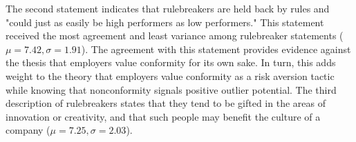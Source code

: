 \documentclass[review]{elsarticle}
\begin{document}
The second statement indicates that rulebreakers are held back by rules and "could just as easily be high performers as low performers."
This statement received the most agreement and least variance among rulebreaker statements ($\mu = 7.42, \sigma = 1.91$).
The agreement with this statement provides evidence against the thesis that employers value conformity for its own sake.
In turn, this adds weight to the theory that employers value conformity as a risk aversion tactic while knowing that nonconformity signals positive outlier potential.
The third description of rulebreakers states that they tend to be gifted in the areas of innovation or creativity,
and that such people may benefit the culture of a company ($\mu = 7.25, \sigma = 2.03$).

\end{document}
